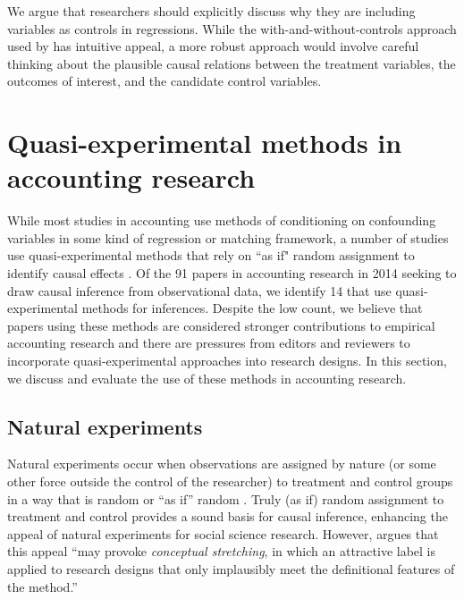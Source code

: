 \documentclass[11pt,reqno,titlepage]{amsart}
\begin{document}
\begin{doublespace}
We argue that researchers should explicitly discuss why they are including variables as controls in regressions.
While the with-and-without-controls approach used by \citet{Larcker:2007aa} has intuitive appeal, a more robust approach would involve careful thinking about the plausible causal relations between the treatment variables, the outcomes of interest, and the candidate control variables.

\section{Quasi-experimental methods in accounting research} \label{sec:quasi}

While most studies in accounting use methods of conditioning on confounding variables in some kind of regression or matching framework, a number of studies use quasi-experimental methods that rely on ``as if" random assignment to identify causal effects \citep{Dunning:2012tt}.
Of the 91 papers in accounting research in 2014 seeking to draw causal inference from observational data, we identify 14 that use quasi-experimental methods for inferences. Despite the low count, we believe that papers using these methods are considered stronger contributions to empirical accounting research and there are pressures from editors and reviewers to incorporate quasi-experimental approaches into research designs.
In this section, we discuss and evaluate the use of these methods in accounting research.


\subsection{Natural experiments}
Natural experiments occur when observations are assigned by nature (or some other force outside the control of the researcher) to treatment and control groups in a way that is random or ``as if'' random \citep{Dunning:2012tt}. 
Truly (as if) random assignment to treatment and control provides a sound basis for causal inference, enhancing the appeal of natural experiments for social science research.
However, \citet[\,p.3, emphasis added]{Dunning:2012tt} argues that this appeal ``may provoke \emph{conceptual stretching}, in which an attractive label is applied to research designs that only implausibly meet the definitional features of the method.'' 


\end{doublespace}
\end{document}
